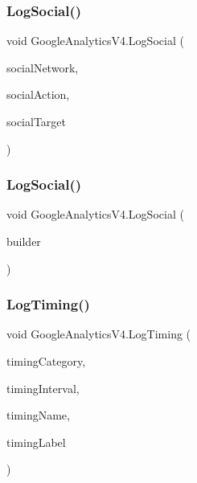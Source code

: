 \subsubsection{\texorpdfstring{Log\+Social()}{LogSocial()}\hspace{0.1cm}{\footnotesize\ttfamily [1/2]}}
{\footnotesize\ttfamily void Google\+Analytics\+V4.\+Log\+Social (\begin{DoxyParamCaption}\item[{string}]{social\+Network,  }\item[{string}]{social\+Action,  }\item[{string}]{social\+Target }\end{DoxyParamCaption})}

\mbox{\label{class_google_analytics_v4_a1d8448a6fd87aebbb6958f2b907c0e64}} 
\subsubsection{\texorpdfstring{Log\+Social()}{LogSocial()}\hspace{0.1cm}{\footnotesize\ttfamily [2/2]}}
{\footnotesize\ttfamily void Google\+Analytics\+V4.\+Log\+Social (\begin{DoxyParamCaption}\item[{\hyperlink{class_social_hit_builder}{Social\+Hit\+Builder}}]{builder }\end{DoxyParamCaption})}

\mbox{\label{class_google_analytics_v4_acb3585828e95d3582df1a9ed12780ee1}} 
\subsubsection{\texorpdfstring{Log\+Timing()}{LogTiming()}\hspace{0.1cm}{\footnotesize\ttfamily [1/2]}}
{\footnotesize\ttfamily void Google\+Analytics\+V4.\+Log\+Timing (\begin{DoxyParamCaption}\item[{string}]{timing\+Category,  }\item[{long}]{timing\+Interval,  }\item[{string}]{timing\+Name,  }\item[{string}]{timing\+Label }\end{DoxyParamCaption})}


